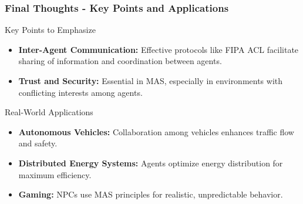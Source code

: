 \documentclass[aspectratio=169]{beamer}
\begin{document}
\begin{frame}[fragile]
    \frametitle{Final Thoughts - Key Points and Applications}
    \begin{block}{Key Points to Emphasize}
        \begin{itemize}
            \item \textbf{Inter-Agent Communication:} Effective protocols like FIPA ACL facilitate sharing of information and coordination between agents.
            \item \textbf{Trust and Security:} Essential in MAS, especially in environments with conflicting interests among agents.
        \end{itemize}
    \end{block}
    
    \begin{block}{Real-World Applications}
        \begin{itemize}
            \item \textbf{Autonomous Vehicles:} Collaboration among vehicles enhances traffic flow and safety.
            \item \textbf{Distributed Energy Systems:} Agents optimize energy distribution for maximum efficiency.
            \item \textbf{Gaming:} NPCs use MAS principles for realistic, unpredictable behavior.
        \end{itemize}
    \end{block}
\end{frame}
\end{document}
